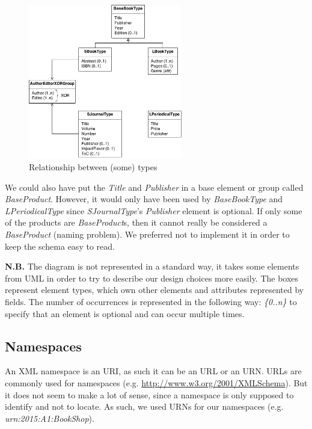 \begin{figure}[h!]
    \includegraphics[width=0.6\textwidth]{images/subclassingCompositionDiag.png}
    \centering
    \caption{Relationship between (some) types}
\end{figure}

We could also have put the \emph{Title} and \emph{Publisher} in a base element
or group called \emph{BaseProduct}. However, it would only have been used by
\emph{BaseBookType} and \emph{LPeriodicalType} since \emph{SJournalType}'s
\emph{Publisher} element is optional. If only some of the products are
\emph{BaseProduct}s, then it cannot really be considered a \emph{BaseProduct}
(naming problem). We preferred not to implement it in order to keep the schema
easy to read.\\

\begin{framehint}
\textbf{N.B.} The diagram is not represented in a standard way, it takes some
elements from UML in order to try to describe our design choices more easily.
The boxes represent element types, which own other elements and attributes
represented by fields. The number of occurrences is represented in the following
way: \emph{\{0..n\}} to specify that an element is optional and can occur multiple
times.
\end{framehint}

\subsection{Namespaces \small{
    \cite{cite:oracleNamespaces} \cite{cite:liquidNamespaces}
}}

An XML namespace is an URI, as such it can be an URL or an URN. URLs are
commonly used for namespaces (e.g.
\href{http://www.w3.org/2001/XMLSchema}{http://www.w3.org/2001/XMLSchema}). But
it does not seem to make a lot of sense, since a namespace is only supposed to
identify and not to locate. As such, we used URNs for our namespaces (e.g.
\emph{urn:2015:A1:BookShop}).\\
    
